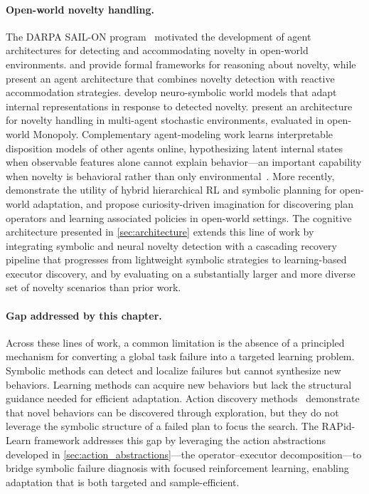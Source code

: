 \paragraph{Open-world novelty handling.}
The DARPA SAIL-ON program~\citep{senator2019science} motivated the development of agent architectures for detecting and accommodating novelty in open-world environments. \citet{boult2021towards} and \citet{langley2020open} provide formal frameworks for reasoning about novelty, while \citet{muhammad2021novelty} present an agent architecture that combines novelty detection with reactive accommodation strategies. \citet{balloch2023neuro} develop neuro-symbolic world models that adapt internal representations in response to detected novelty. \citet{thai2022architecture} present an architecture for novelty handling in multi-agent stochastic environments, evaluated in open-world Monopoly. Complementary agent-modeling work learns interpretable disposition models of other agents online, hypothesizing latent internal states when observable features alone cannot explain behavior---an important capability when novelty is behavioral rather than only environmental~\citep{lymperopoulos2024agentmodels}. More recently, \citet{lorang2024adapting} demonstrate the utility of hybrid hierarchical RL and symbolic planning for open-world adaptation, and \citet{lorang2025curiosity} propose curiosity-driven imagination for discovering plan operators and learning associated policies in open-world settings. The cognitive architecture presented in \cref{sec:architecture} extends this line of work by integrating symbolic and neural novelty detection with a cascading recovery pipeline that progresses from lightweight symbolic strategies to learning-based executor discovery, and by evaluating on a substantially larger and more diverse set of novelty scenarios than prior work.

\paragraph{Gap addressed by this chapter.}
Across these lines of work, a common limitation is the absence of a principled mechanism for converting a global task failure into a targeted learning problem. Symbolic methods can detect and localize failures but cannot synthesize new behaviors. Learning methods can acquire new behaviors but lack the structural guidance needed for efficient adaptation. Action discovery methods~\citep{gizzi2019creative,gizzi2021behavior} demonstrate that novel behaviors can be discovered through exploration, but they do not leverage the symbolic structure of a failed plan to focus the search. The RAPid-Learn framework addresses this gap by leveraging the action abstractions developed in \cref{sec:action_abstractions}---the operator--executor decomposition---to bridge symbolic failure diagnosis with focused reinforcement learning, enabling adaptation that is both targeted and sample-efficient.